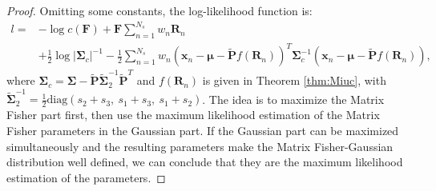\documentclass[12pt]{article}
\begin{document}
\begin{proof}
	Omitting some constants, the log-likelihood function is:
	\begin{equation}
		\begin{split}
			l = &-\log{c(\mathbf{F})} + \mathbf{F}\sum_{n=1}^{N_s}w_n\mathbf{R}_n \\
			&+\frac{1}{2}\log{|\mathbf{\Sigma}_c|^{-1}} - \frac{1}{2}\sum_{n=1}^{N_s}w_n\left(\bm{x}_n-\bm{\mu}-\tilde{\mathbf{P}}f(\mathbf{R}_n)\right)^T\mathbf{\Sigma}_c^{-1}\left(\bm{x}_n-\bm{\mu}-\tilde{\mathbf{P}}f(\mathbf{R}_n)\right),
		\end{split}
	\end{equation}
	where $\mathbf{\Sigma}_c = \mathbf{\Sigma}-\tilde{\mathbf{P}}\tilde{\mathbf{\Sigma}}_2^{-1}\tilde{\mathbf{P}}^T$ and $f(\mathbf{R}_n)$ is given in Theorem \ref{thm:Miuc}, with $\tilde{\mathbf{\Sigma}}_2^{-1} = \frac{1}{2}\mathrm{diag}(s_2+s_3,\ s_1+s_3,\ s_1+s_2)$.
	The idea is to maximize the Matrix Fisher part first, then use the maximum likelihood estimation of the Matrix Fisher parameters in the Gaussian part.
	If the Gaussian part can be maximized simultaneously and the resulting parameters make the Matrix Fisher-Gaussian distribution well defined, we can conclude that they are the maximum likelihood estimation of the parameters.
	

\end{proof}
\end{document}
